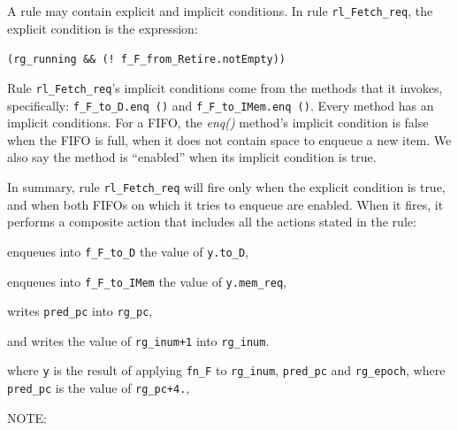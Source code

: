 A rule may contain explicit and implicit conditions. In rule
\verb|rl_Fetch_req|, the explicit condition is the expression:

\hm\small \verb|(rg_running && (! f_F_from_Retire.notEmpty))|

Rule \verb|rl_Fetch_req|'s implicit conditions come from the methods
that it invokes, specifically: \verb|f_F_to_D.enq ()| and
\verb|f_F_to_IMem.enq ()|.  Every method has an implicit conditions.
For a FIFO, the \emph{enq()} method's implicit condition is false when
the FIFO is full, {\ie} when it does not contain space to enqueue a
new item.  We also say the method is ``enabled'' when its implicit
condition is true.

In summary, rule \verb|rl_Fetch_req| will fire only when the explicit
condition is true, and when both FIFOs on which it tries to enqueue
are enabled.  When it fires, it performs a composite action that
includes all the actions stated in the rule:

\begin{tightlist}

 \item enqueues into \verb|f_F_to_D| the value of \verb|y.to_D|,

 \item enqueues into \verb|f_F_to_IMem| the value of \verb|y.mem_req|,

 \item writes \verb|pred_pc| into \verb|rg_pc|,

 \item and writes the value of \verb|rg_inum+1| into \verb|rg_inum|.

\end{tightlist}
where \verb|y| is the result of applying \verb|fn_F| to
\verb|rg_inum|, \verb|pred_pc| and \verb|rg_epoch|, where
\verb|pred_pc| is the value of \verb|rg_pc+4.|,

NOTE:

